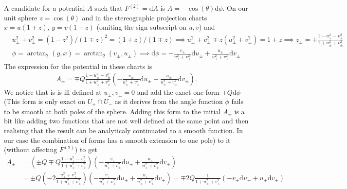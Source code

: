 \documentclass[10pt, a4paper]{article}
\begin{document}
{\begin{enumerate}
  A candidate for a potential $A$ such that $F^{(2)} = \text{d}A$ is $A = -\cos(\theta)\text{d}\phi$. On our unit sphere $z = \cos(\theta)$ and in the stereographic projection charts $x = u (1\mp z)$, $y = v (1\mp z)$ (omiting the sign subscript on $u, v$) and 
  \begin{align*}
    &u_\pm^2 + v_\pm^2 = (1-z^2)/(1\mp z)^2 = (1 \pm z)/(1 \mp z) \implies u_\pm^2 + v_\pm^2 \mp z(u_\pm^2 + v_\pm^2)  = 1 \pm z \implies  z_\pm = \pm \frac{1 - u_\pm^2 - v_\pm^2}{1 + u_\pm^2 + v_\pm^2}\\
    &\phi = \arctan_2(y, x) = \arctan_2(v_\pm, u_\pm) \implies \text{d}\phi = -\frac{v_\pm}{u_\pm^2+v_\pm^2}\text{d}u_\pm + \frac{u_\pm}{u^2_\pm+v^2_\pm}\text{d}v_\pm
  \end{align*}
  The expression for the potential in these charts is 
  \begin{align*}
    A_\pm = \mp Q\frac{1 - u_\pm^2 - v_\pm^2}{1 + u_\pm^2 + v_\pm^2} \left(-\frac{v_\pm}{u_\pm^2+v_\pm^2}\text{d}u_\pm + \frac{u_\pm}{u_\pm^2+v_\pm^2}\text{d}v_{\pm} \right). 
  \end{align*}
  We notice that is is ill defined at $u_\pm, v_\pm = 0$ and add the exact one-form $\pm Q\text{d}\phi$ (This form is only exact on $U_{+} \cap U_{-}$ as it derives from the angle function $\phi$ fails to be smooth at both poles of the sphere. Adding this form to the initial $A_\pm$ is a bit like adding two functions that are not well defined at the same point and then realising that the result can be analyticaly continuated to a smooth function. In our case the combination of forms has a smooth extension to one pole) to it (without affecting $F^{(2)}$) to get 
  \begin{align*}
    A_\pm &= \left(\pm Q \mp Q  \frac{1 - u_\pm^2 - v_\pm^2}{1 + u_\pm^2 + v_\pm^2}\right) \left(-\frac{v_\pm}{u_\pm^2+v_\pm^2}\text{d}u_\pm + \frac{u_\pm}{u_\pm^2+v_\pm^2}\text{d}v_{\pm}\right)\\
    &=  
    \pm Q\left(- 2 \frac{u_\pm^2 + v_\pm^2}{1 + u_\pm^2 + v_\pm^2}\right) \left(-\frac{v_\pm}{u_\pm^2+v_\pm^2}\text{d}u_\pm + \frac{u_\pm}{u_\pm^2+v_\pm^2}\text{d}v_{\pm} \right) = \mp 2Q\frac{1}{1 + u_\pm^2 + v_\pm^2}\left(-v_\pm\text{d}u_\pm + u_\pm\text{d}v_{\pm} \right) 
  \end{align*}

\end{enumerate}}
\end{document}

